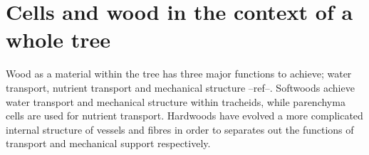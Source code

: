 \section{Cells and wood in the context of a whole tree}
Wood as a material within the tree has three major functions to achieve; water
transport, nutrient transport and mechanical structure --ref--. Softwoods
achieve water transport and mechanical structure within tracheids, while
parenchyma cells are used for nutrient transport. Hardwoods have evolved a more
complicated internal structure of vessels and fibres in order to separates out
the functions of transport and mechanical support respectively.